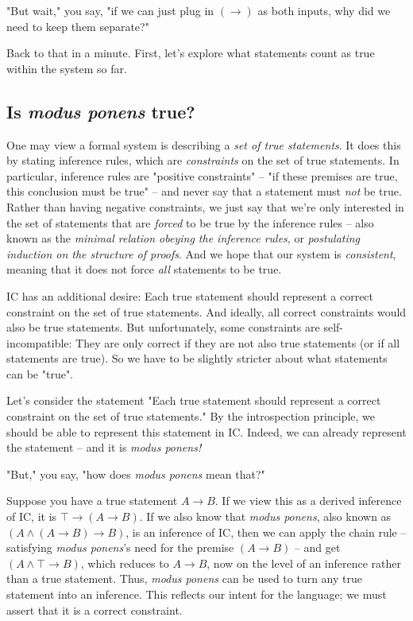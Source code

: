 \documentclass{article}
\begin{document}
  "But wait," you say, "if we can just plug in $(\to)$ as both inputs, why did we need to keep them separate?"
  
  Back to that in a minute. First, let's explore what statements count as true within the system so far.
  
  \subsection{Is \emph{modus ponens} true?}
  
  One may view a formal system is describing a \emph{set of true statements}. It does this by stating inference rules, which are \emph{constraints} on the set of true statements. In particular, inference rules are "positive constraints" – "if these premises are true, this conclusion must be true" – and never say that a statement must \emph{not} be true. Rather than having negative constraints, we just say that we're only interested in the set of statements that are \emph{forced} to be true by the inference rules – also known as the \emph{minimal relation obeying the inference rules}, or \emph{postulating induction on the structure of proofs}. And we hope that our system is \emph{consistent}, meaning that it does not force \emph{all} statements to be true.
  
  IC has an additional desire: Each true statement should represent a correct constraint on the set of true statements. And ideally, all correct constraints would also be true statements. But unfortunately, some constraints are self-incompatible: They are only correct if they are not also true statements (or if all statements are true). So we have to be slightly stricter about what statements can be "true".
  
  Let's consider the statement "Each true statement should represent a correct constraint on the set of true statements." By the introspection principle, we should be able to represent this statement in IC. Indeed, we can already represent the statement – and it is \emph{modus ponens!}
  
  "But," you say, "how does \emph{modus ponens} mean that?"
  
  Suppose you have a true statement $A \to B$. If we view this as a derived inference of IC, it is $\top \to (A \to B)$. If we also know that \emph{modus ponens}, also known as $(A \wedge (A \to B) \to B)$, is an inference of IC, then we can apply the chain rule – satisfying \emph{modus ponens}'s need for the premise $(A \to B)$ – and get $(A \wedge \top \to B)$, which reduces to $A \to B$, now on the level of an inference rather than a true statement. Thus, \emph{modus ponens} can be used to turn any true statement into an inference. This reflects our intent for the language; we must assert that it is a correct constraint.
  
\end{document}
